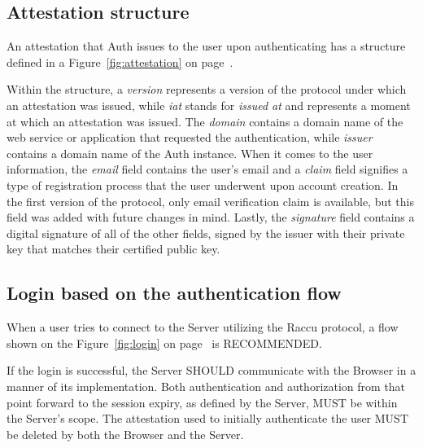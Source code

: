     \subsection{Attestation structure}
    An attestation that Auth issues to the user upon authenticating has a structure defined in a Figure~\ref{fig:attestation}
    on page~\pageref{fig:attestation}.
    
    Within the structure, a \textit{version} represents a version of the protocol under which an attestation was issued, 
    while \textit{iat} stands for \textit{issued at} and represents a moment at which an attestation was issued. The 
    \textit{domain} contains a domain name of the web service or application that requested the authentication, while 
    \textit{issuer} contains a domain name of the Auth instance. When it comes to the user information, the \textit{email}
    field contains the user's email and a \textit{claim} field signifies a type of registration process that the user 
    underwent upon account creation. In the first version of the protocol, only email verification claim is available, but 
    this field was added with future changes in mind. Lastly, the \textit{signature} field contains a digital signature of 
    all of the other fields, signed by the issuer with their private key that matches their certified public key. 

    \subsection{Login based on the authentication flow}
    When a user tries to connect to the Server utilizing the Raccu protocol, a flow shown on the Figure~\ref{fig:login} 
    on page~\pageref{fig:login} is RECOMMENDED.
    
    If the login is successful, the Server SHOULD communicate with the Browser in a manner of its implementation. Both 
    authentication and authorization from that point forward to the session expiry, as defined by the Server, MUST be 
    within the Server's scope. The attestation used to initially authenticate the user MUST be deleted by both the Browser
    and the Server.       
